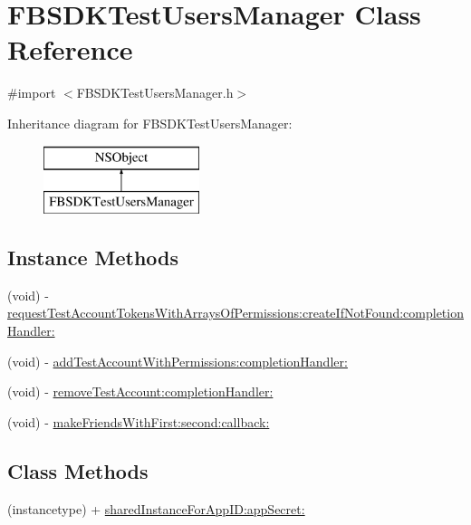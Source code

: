 \hypertarget{interface_f_b_s_d_k_test_users_manager}{}\section{F\+B\+S\+D\+K\+Test\+Users\+Manager Class Reference}
\label{interface_f_b_s_d_k_test_users_manager}


{\ttfamily \#import $<$F\+B\+S\+D\+K\+Test\+Users\+Manager.\+h$>$}

Inheritance diagram for F\+B\+S\+D\+K\+Test\+Users\+Manager\+:\begin{figure}[H]
\begin{center}
\leavevmode
\includegraphics[height=2.000000cm]{interface_f_b_s_d_k_test_users_manager}
\end{center}
\end{figure}
\subsection*{Instance Methods}
\begin{DoxyCompactItemize}
\item 
(void) -\/ \hyperlink{interface_f_b_s_d_k_test_users_manager_a112c6b79b6abb30dd84460d20b1e0e52}{request\+Test\+Account\+Tokens\+With\+Arrays\+Of\+Permissions\+:create\+If\+Not\+Found\+:completion\+Handler\+:}
\item 
(void) -\/ \hyperlink{interface_f_b_s_d_k_test_users_manager_a2b6f759bb6df5a0e48be766249bd39b9}{add\+Test\+Account\+With\+Permissions\+:completion\+Handler\+:}
\item 
(void) -\/ \hyperlink{interface_f_b_s_d_k_test_users_manager_a10eedbc811e46c6daa646c1e033a3409}{remove\+Test\+Account\+:completion\+Handler\+:}
\item 
(void) -\/ \hyperlink{interface_f_b_s_d_k_test_users_manager_ab1f541d7dda83422878e8478a76e1ae0}{make\+Friends\+With\+First\+:second\+:callback\+:}
\end{DoxyCompactItemize}
\subsection*{Class Methods}
\begin{DoxyCompactItemize}
\item 
(instancetype) + \hyperlink{interface_f_b_s_d_k_test_users_manager_a19d2ddda3cf14c5c2969165311cff3e5}{shared\+Instance\+For\+App\+I\+D\+:app\+Secret\+:}
\end{DoxyCompactItemize}


